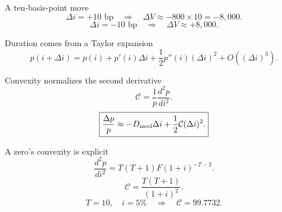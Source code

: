 \documentclass[12pt,aspectratio=169]{beamer}
\begin{document}

\begin{frame}{A ten-basis-point move}
\[\Delta i=+10\text{ bp}\quad\Rightarrow\quad\Delta V\approx-800\times10=-8{,}000.\]\[\Delta i=-10\text{ bp}\quad\Rightarrow\quad\Delta V\approx+8{,}000.\]
\end{frame}


\begin{frame}{Duration comes from a Taylor expansion}
\[p(i+\Delta i)=p(i)+p'(i)\Delta i+\frac12p''(i)(\Delta i)^2+O((\Delta i)^3).\]
\end{frame}


\begin{frame}{Convexity normalizes the second derivative}
\[\mathcal C=\frac1p\frac{d^2p}{di^2}.\]\[\boxed{\frac{\Delta p}{p}\approx-D_{\rm mod}\Delta i+\frac12\mathcal C(\Delta i)^2.}\]
\end{frame}


\begin{frame}{A zero’s convexity is explicit}
\[\frac{d^2p}{di^2}=T(T+1)F(1+i)^{-T-2}.\]\[\boxed{\mathcal C=\frac{T(T+1)}{(1+i)^2}.}\]\[T=10,\quad i=5\%\quad\Rightarrow\quad\mathcal C=99.7732.\]
\end{frame}

\end{document}
